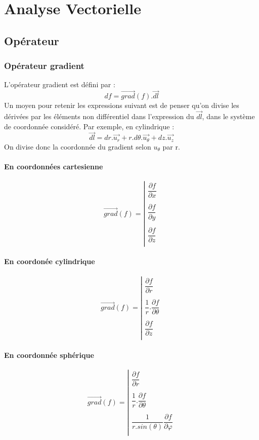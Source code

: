 
\chapter{Analyse Vectorielle}
\section{Opérateur}
\subsection{Opérateur gradient}
\begin{de}
L'opérateur gradient est défini par :
$$df = \overrightarrow{grad}(f).\overrightarrow{dl}$$
Un moyen pour retenir les expressions suivant est de penser qu'on divise les dérivées par les éléments non différentiel dans l'expression du $\overrightarrow{dl}$, dans le système de coordonnée considéré. Par exemple, en cylindrique : 
$$\overrightarrow{dl} = dr.\overrightarrow{u_r}+r.d\theta.\overrightarrow{u_{\theta}}+dz.\overrightarrow{u_z}$$
On divise donc la coordonnée du gradient selon $u_{\theta}$ par r.
\end{de}
\subsubsection{En coordonnées cartesienne}
\[ \overrightarrow{grad}(f) = \left|
 \begin{array}{*{4}{c}}
\dfrac{\partial f}{\partial x}\\
 			      \\
\dfrac{\partial f}{\partial y}\\
			      \\
\dfrac{\partial f}{\partial z}\\
\end{array} \right. \]
\subsubsection{En coordonée cylindrique}
\[ \overrightarrow{grad}(f) = \left|
 \begin{array}{*{4}{c}}
\dfrac{\partial f}{\partial r}\\
 			      \\
\dfrac{1}{r}.\dfrac{\partial f}{\partial \theta}\\
			      \\
\dfrac{\partial f}{\partial z}\\
\end{array} \right. \]
\subsubsection{En coordonnée sphérique}
\[ \overrightarrow{grad}(f) = \left|
 \begin{array}{*{4}{c}}
\dfrac{\partial f}{\partial r}\\
 			      \\
\dfrac{1}{r}.\dfrac{\partial f}{\partial \theta}\\
			      \\
\dfrac{1}{r.sin(\theta)}\dfrac{\partial f}{\partial \varphi}\\
\end{array} \right. \]
